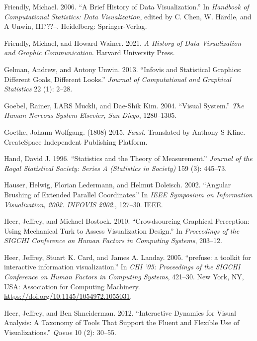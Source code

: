 \documentclass[
]{book}
\newlength{\cslhangindent}
\newenvironment{CSLReferences}[2] %
 {\begin{list}{}{%
  \setlength{\itemindent}{0pt}
  \setlength{\leftmargin}{0pt}
  \setlength{\parsep}{0pt}
  \ifodd #1
   \setlength{\leftmargin}{\cslhangindent}
   \setlength{\itemindent}{-1\cslhangindent}
  \fi
  \setlength{\itemsep}{#2\baselineskip}}}
 {\end{list}}
\begin{document}
\begin{CSLReferences}{1}{0}
Friendly, Michael. 2006. {``A Brief History of Data Visualization.''} In \emph{Handbook of Computational Statistics: Data Visualization}, edited by C. Chen, W. Härdle, and A Unwin, III???--. Heidelberg: Springer-Verlag.

Friendly, Michael, and Howard Wainer. 2021. \emph{A History of Data Visualization and Graphic Communication}. Harvard University Press.

Gelman, Andrew, and Antony Unwin. 2013. {``Infovis and Statistical Graphics: Different Goals, Different Looks.''} \emph{Journal of Computational and Graphical Statistics} 22 (1): 2--28.

Goebel, Rainer, LARS Muckli, and Dae-Shik Kim. 2004. {``Visual System.''} \emph{The Human Nervous System Elsevier, San Diego}, 1280--1305.

Goethe, Johann Wolfgang. (1808) 2015. \emph{Faust}. Translated by Anthony S Kline. CreateSpace Independent Publishing Platform.

Hand, David J. 1996. {``Statistics and the Theory of Measurement.''} \emph{Journal of the Royal Statistical Society: Series A (Statistics in Society)} 159 (3): 445--73.

Hauser, Helwig, Florian Ledermann, and Helmut Doleisch. 2002. {``Angular Brushing of Extended Parallel Coordinates.''} In \emph{IEEE Symposium on Information Visualization, 2002. INFOVIS 2002.}, 127--30. IEEE.

Heer, Jeffrey, and Michael Bostock. 2010. {``Crowdsourcing Graphical Perception: Using Mechanical Turk to Assess Visualization Design.''} In \emph{Proceedings of the SIGCHI Conference on Human Factors in Computing Systems}, 203--12.

Heer, Jeffrey, Stuart K. Card, and James A. Landay. 2005. {``{prefuse: a toolkit for interactive information visualization}.''} In \emph{{CHI '05: Proceedings of the SIGCHI Conference on Human Factors in Computing Systems}}, 421--30. New York, NY, USA: Association for Computing Machinery. \url{https://doi.org/10.1145/1054972.1055031}.

Heer, Jeffrey, and Ben Shneiderman. 2012. {``Interactive Dynamics for Visual Analysis: A Taxonomy of Tools That Support the Fluent and Flexible Use of Visualizations.''} \emph{Queue} 10 (2): 30--55.


\end{CSLReferences}
\end{document}
